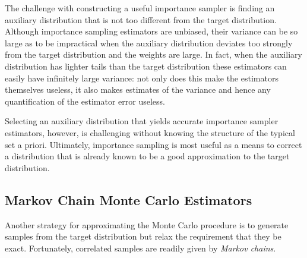 \documentclass[11pt, oneside]{article}
\begin{document}
The challenge with constructing a useful importance sampler is
finding an auxiliary distribution that is not too different from the
target distribution.  Although importance sampling estimators are 
unbiased, their variance can be so large as to be impractical when 
the auxiliary distribution deviates too strongly from the target distribution 
and the weights are large.  In fact, when the auxiliary distribution has 
lighter tails than the target distribution these estimators can 
easily have infinitely large variance: not only does this make 
the estimators themselves useless, it also makes estimates of 
the variance and hence any quantification of the estimator error 
useless.

Selecting an auxiliary distribution that yields accurate importance
sampler estimators, however, is challenging without knowing
the structure of the typical set a priori.  Ultimately, importance
sampling is most useful as a means to correct a distribution that 
is already known to be a good approximation to the target
distribution.

\subsection{Markov Chain Monte Carlo Estimators}

Another strategy for approximating the Monte Carlo procedure
is to generate samples from the target distribution but relax
the requirement that they be exact.  Fortunately, correlated 
samples are readily given by \emph{Markov chains}.
\end{document}
